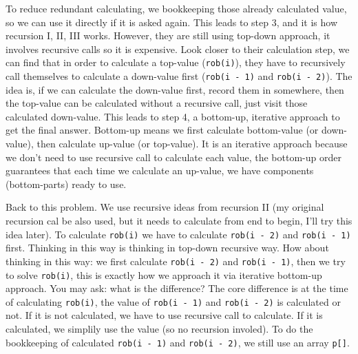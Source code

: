 \documentclass[12pt]{article}
\begin{document}
To reduce redundant calculating, we bookkeeping those already calculated value, so we can use it directly if it is asked again. This leads to step 3, and it is how recursion I, II, III works. However, they are still using top-down approach, it involves recursive calls so it is expensive. Look closer to their calculation step, we can find that in order to calculate a top-value (\texttt{rob(i)}), they have to recursively call themselves to calculate a down-value first (\texttt{rob(i - 1)} and \texttt{rob(i - 2)}). The idea is, if we can calculate the down-value first, record them in somewhere, then the top-value can be calculated without a recursive call, just visit those calculated down-value. This leads to step 4, a bottom-up, iterative approach to get the final answer. Bottom-up means we first calculate bottom-value (or down-value), then calculate up-value (or top-value). It is an iterative approach because we don't need to use recursive call to calculate each value, the bottom-up order guarantees that each time we calculate an up-value, we have components (bottom-parts) ready to use.

Back to this problem. We use recursive ideas from recursion II (my original recursion cal be also used, but it needs to calculate from end to begin, I'll try this idea later). To calculate \texttt{rob(i)} we have to calculate \texttt{rob(i - 2)} and \texttt{rob(i - 1)} first. Thinking in this way is thinking in top-down recursive way. How about thinking in this way: we first calculate \texttt{rob(i - 2)} and \texttt{rob(i - 1)}, then we try to solve \texttt{rob(i)}, this is exactly how we approach it via iterative bottom-up approach. You may ask: what is the difference? The core difference is at the time of calculating \texttt{rob(i)}, the value of \texttt{rob(i - 1)} and \texttt{rob(i - 2)} is calculated or not. If it is not calculated, we have to use recursive call to calculate. If it is calculated, we simplily use the value (so no recursion involed). To do the bookkeeping of calculated \texttt{rob(i - 1)} and \texttt{rob(i - 2)}, we still use an array \texttt{p[]}.
\end{document}
